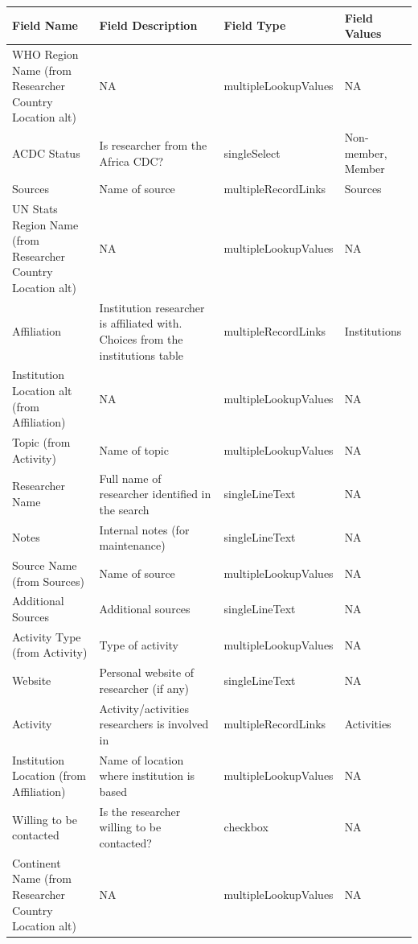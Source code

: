 \documentclass[
]{book}
\begin{document}
\begin{table}
\centering
\begin{tabular}{l|l|l|l}
\hline
\textbf{Field Name} & \textbf{Field Description} & \textbf{Field Type} & \textbf{Field Values}\\
\hline
WHO Region Name (from Researcher Country Location alt) & NA & multipleLookupValues & NA\\
\hline
ACDC Status & Is researcher from the Africa CDC? & singleSelect & Non-member, Member\\
\hline
Sources & Name of source & multipleRecordLinks & Sources\\
\hline
UN Stats Region Name (from Researcher Country Location alt) & NA & multipleLookupValues & NA\\
\hline
Affiliation & Institution researcher is affiliated with. Choices from the institutions table & multipleRecordLinks & Institutions\\
\hline
Institution Location alt (from Affiliation) & NA & multipleLookupValues & NA\\
\hline
Topic (from Activity) & Name of topic & multipleLookupValues & NA\\
\hline
Researcher Name & Full name of researcher identified in the search & singleLineText & NA\\
\hline
Notes & Internal notes (for maintenance) & singleLineText & NA\\
\hline
Source Name (from Sources) & Name of source & multipleLookupValues & NA\\
\hline
Additional Sources & Additional sources & singleLineText & NA\\
\hline
Activity Type (from Activity) & Type of activity & multipleLookupValues & NA\\
\hline
Website & Personal website of researcher (if any) & singleLineText & NA\\
\hline
Activity & Activity/activities researchers is involved in & multipleRecordLinks & Activities\\
\hline
Institution Location (from Affiliation) & Name of location where institution is based & multipleLookupValues & NA\\
\hline
Willing to be contacted & Is the researcher willing to be contacted? & checkbox & NA\\
\hline
Continent Name (from Researcher Country Location alt) & NA & multipleLookupValues & NA\\
\hline
\end{tabular}
\end{table}
\end{document}

